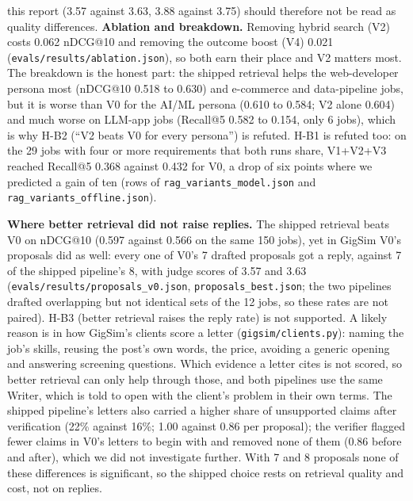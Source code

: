 \documentclass[10pt,a4paper]{article}
\newcommand{\file}[1]{\texttt{\small #1}}
\newcommand{\tablefrom}[2]{\begin{table}[h]\centering\caption{#2}\end{table}}
\begin{document}
this report (3.57 against 3.63, 3.88 against 3.75) should therefore not be read as quality differences.
\textbf{Ablation and breakdown.} Removing hybrid search (V2) costs 0.062 nDCG@10 and removing the outcome boost (V4)
0.021 (\file{evals/results/ablation.json}), so both earn their place and V2 matters most. The breakdown is the honest
part: the shipped retrieval helps the web-developer persona most (nDCG@10 0.518 to 0.630) and e-commerce and data-pipeline
jobs, but it is worse than V0 for the AI/ML persona (0.610 to 0.584; V2 alone 0.604) and much worse on LLM-app jobs (Recall@5 0.582 to
0.154, only 6 jobs), which is why H-B2 (``V2 beats V0 for every persona'') is refuted. H-B1 is refuted too: on the 29 jobs with four or
more requirements that both runs share, V1+V2+V3 reached Recall@5 0.368 against 0.432 for V0, a drop of six points
where we predicted a gain of ten (rows of \file{rag\_variants\_model.json} and \file{rag\_variants\_offline.json}).
\tablefrom{ablation}{The shipped retrieval with one component removed at a time (dev set, no model calls).}
\tablefrom{breakdown}{V0 against the shipped retrieval by persona, number of requirements and job type (dev set).}
\textbf{Where better retrieval did not raise replies.} The shipped retrieval beats V0 on nDCG@10 (0.597 against 0.566 on
the same 150 jobs), yet in GigSim V0's proposals did as well: every one of V0's 7 drafted proposals got a reply, against
7 of the shipped pipeline's 8, with judge scores of 3.57 and 3.63 (\file{evals/results/proposals\_v0.json},
\file{proposals\_best.json}; the two pipelines drafted overlapping but not identical sets of the 12 jobs, so these
rates are not paired). H-B3 (better retrieval raises the reply rate) is not supported. A likely reason is in how GigSim's clients score a letter
(\file{gigsim/clients.py}): naming the job's skills, reusing the post's own words, the price, avoiding a generic opening
and answering screening questions. Which evidence a letter cites is not scored, so better retrieval can only help
through those, and both pipelines use the same Writer, which is told to open with the client's problem in their own
terms. The shipped pipeline's letters also carried a higher share of unsupported claims after verification (22\%
against 16\%; 1.00 against 0.86 per proposal); the verifier flagged fewer claims in V0's letters to begin with and
removed none of them (0.86 before and after), which we did not investigate further. With 7 and 8 proposals none of these differences is significant, so the
shipped choice rests on retrieval quality and cost, not on replies.
\end{document}

